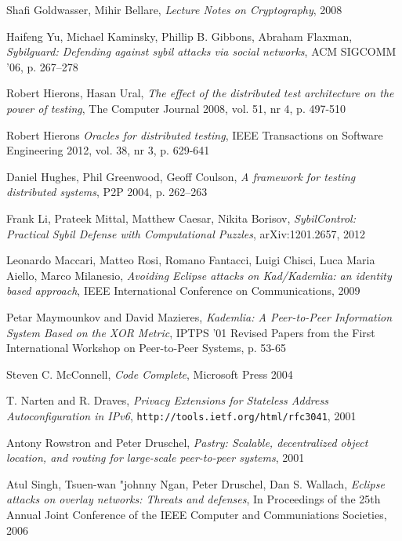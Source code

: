 \begin{thebibliography}{99}
  Shafi Goldwasser, Mihir Bellare,
  \textit{Lecture Notes on Cryptography},
  2008


Haifeng Yu, Michael Kaminsky, Phillip B. Gibbons, Abraham Flaxman,
\textit{Sybilguard: Defending against sybil attacks via social networks},
ACM SIGCOMM ’06, p. 267--278

  Robert Hierons, Hasan Ural,
  \textit{The effect of the distributed test architecture on the power of testing},
  The Computer Journal 2008, vol. 51, nr 4, p. 497-510

  Robert Hierons
  \textit{Oracles for distributed testing},
  IEEE Transactions on Software Engineering 2012, vol. 38, nr 3, p. 629-641

  Daniel Hughes, Phil Greenwood, Geoff Coulson,
  \textit{A framework for testing distributed systems},
  P2P 2004, p. 262--263

Frank Li, Prateek Mittal, Matthew Caesar, Nikita Borisov,
\textit{SybilControl: Practical Sybil Defense with Computational Puzzles},
arXiv:1201.2657, 2012

  Leonardo Maccari, Matteo Rosi, Romano Fantacci, Luigi Chisci, Luca Maria
  Aiello, Marco Milanesio,
  \textit{Avoiding Eclipse attacks on Kad/Kademlia: an identity based approach},
   IEEE International Conference on Communications, 2009

  Petar Maymounkov and David Mazieres,
  \textit{Kademlia: A Peer-to-Peer Information System Based on the XOR Metric},
  IPTPS '01 Revised Papers from the First International Workshop on Peer-to-Peer
  Systems, p. 53-65

  Steven C. McConnell,
  \textit{Code Complete},
  Microsoft Press 2004

  T. Narten and R. Draves,
  \textit{Privacy Extensions for Stateless Address Autoconfiguration in IPv6},
  \texttt{http://tools.ietf.org/html/rfc3041},
  2001

  Antony Rowstron and Peter Druschel,
  \textit{Pastry: Scalable, decentralized object location, and routing for
  large-scale peer-to-peer systems}, 2001

  Atul Singh, Tsuen-wan "johnny Ngan, Peter Druschel, Dan S. Wallach,
  \textit{Eclipse attacks on overlay networks: Threats and defenses},
  In Proceedings of the 25th Annual Joint Conference of the IEEE Computer and
  Communiations Societies, 2006


\end{thebibliography}
